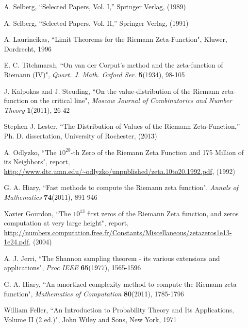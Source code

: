 \documentclass[twoside]{article}
\begin{document}
\begin{thebibliography}{10}
 A. Selberg, ``Selected Papers, Vol. I,''
Springer Verlag,  (1989)

 A. Selberg, ``Selected Papers, Vol. II,''
Springer Verlag,  (1991)



 A. Laurincikas,
``Limit Theorems for the Riemann Zeta-Function",
Kluwer, Dordrecht, 1996

 E. C. Titchmarsh,
``On van der Corput's method and the zeta-function of Riemann (IV)",
{\it Quart. J. Math. Oxford Ser.} {\bf5}(1934), 98-105

 J. Kalpokas and J. Steuding,
``On the value-distribution of the Riemann zeta-function on the critical line", 
{\it Moscow Journal of Combinatorics and
Number Theory} {\bf1}(2011), 26-42

 Stephen J. Lester, ``The Distribution of Values of the
Riemann Zeta-Function,''
Ph. D. dissertation, University of Rochester,  (2013)

  A. Odlyzko,
``The $10^{20}$-th Zero of the Riemann Zeta
Function and 175 Million of its Neighbors", report,
\url{http://www.dtc.umn.edu/~odlyzko/unpublished/zeta.10to20.1992.pdf}, (1992)

 G. A. Hiary,
``Fast methods to compute the Riemann zeta function",
{\it Annals of Mathematics} {\bf74}(2011), 891-946

 Xavier Gourdon,
``The $10^{13}$ first zeros of the Riemann Zeta function,
and zeros computation at very large height", report,
\url{http://numbers.computation.free.fr/Constants/Miscellaneous/zetazeros1e13-1e24.pdf}, (2004)

 A. J. Jerri,
``The Shannon sampling theorem - its various extensions and applications",
{\it Proc IEEE} {\bf65}(1977), 1565-1596

 G. A. Hiary,
``An amortized-complexity method to compute the Riemann zeta function", 
{\it Mathematics of Computation} {\bf80}(2011), 1785-1796

 William Feller,
``An Introduction to Probability Theory and Its Applications, Volume II (2 ed.)",
John Wiley and Sons, New York, 1971


\end{thebibliography} 
\end{document}
